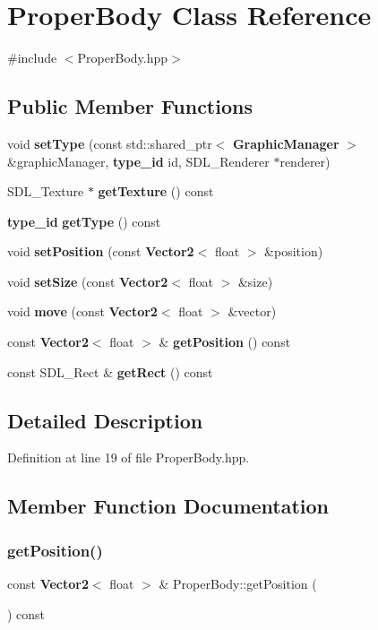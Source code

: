 \section{Proper\+Body Class Reference}
\label{class_proper_body}


{\ttfamily \#include $<$Proper\+Body.\+hpp$>$}

\subsection*{Public Member Functions}
\begin{DoxyCompactItemize}
\item 
void \textbf{ set\+Type} (const std\+::shared\+\_\+ptr$<$ \textbf{ Graphic\+Manager} $>$ \&graphic\+Manager, \textbf{ type\+\_\+id} id, S\+D\+L\+\_\+\+Renderer $\ast$renderer)
\item 
S\+D\+L\+\_\+\+Texture $\ast$ \textbf{ get\+Texture} () const
\item 
\textbf{ type\+\_\+id} \textbf{ get\+Type} () const
\item 
void \textbf{ set\+Position} (const \textbf{ Vector2}$<$ float $>$ \&position)
\item 
void \textbf{ set\+Size} (const \textbf{ Vector2}$<$ float $>$ \&size)
\item 
void \textbf{ move} (const \textbf{ Vector2}$<$ float $>$ \&vector)
\item 
const \textbf{ Vector2}$<$ float $>$ \& \textbf{ get\+Position} () const
\item 
const S\+D\+L\+\_\+\+Rect \& \textbf{ get\+Rect} () const
\end{DoxyCompactItemize}


\subsection{Detailed Description}


Definition at line 19 of file Proper\+Body.\+hpp.



\subsection{Member Function Documentation}
\mbox{\label{class_proper_body_a4c844b11dbb78d0a68a3e7e789694271}} 
\subsubsection{get\+Position()}
{\footnotesize\ttfamily const \textbf{ Vector2}$<$ float $>$ \& Proper\+Body\+::get\+Position (\begin{DoxyParamCaption}{ }\end{DoxyParamCaption}) const\hspace{0.3cm}{\ttfamily [inline]}}



